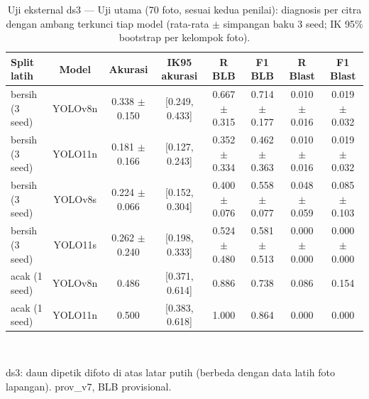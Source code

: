 \begin{table}[!t]
\centering
\caption{Uji eksternal ds3 — Uji utama (70 foto, sesuai kedua penilai): diagnosis per citra dengan ambang terkunci tiap model (rata-rata $\pm$ simpangan baku 3 seed; IK 95\% bootstrap per kelompok foto).}
\label{tab:ds3_utama}
\footnotesize
\begin{tabular}{lccccccc}
\hline
\textbf{Split latih} & \textbf{Model} & \textbf{Akurasi} & \textbf{IK95 akurasi} & \textbf{R BLB} & \textbf{F1 BLB} & \textbf{R Blast} & \textbf{F1 Blast} \\
\hline
bersih (3 seed) & YOLOv8n & 0.338 $\pm$ 0.150 & [0.249, 0.433] & 0.667 $\pm$ 0.315 & 0.714 $\pm$ 0.177 & 0.010 $\pm$ 0.016 & 0.019 $\pm$ 0.032 \\
bersih (3 seed) & YOLO11n & 0.181 $\pm$ 0.166 & [0.127, 0.243] & 0.352 $\pm$ 0.334 & 0.462 $\pm$ 0.363 & 0.010 $\pm$ 0.016 & 0.019 $\pm$ 0.032 \\
bersih (3 seed) & YOLOv8s & 0.224 $\pm$ 0.066 & [0.152, 0.304] & 0.400 $\pm$ 0.076 & 0.558 $\pm$ 0.077 & 0.048 $\pm$ 0.059 & 0.085 $\pm$ 0.103 \\
bersih (3 seed) & YOLO11s & 0.262 $\pm$ 0.240 & [0.198, 0.333] & 0.524 $\pm$ 0.480 & 0.581 $\pm$ 0.513 & 0.000 $\pm$ 0.000 & 0.000 $\pm$ 0.000 \\
acak (1 seed) & YOLOv8n & 0.486 & [0.371, 0.614] & 0.886 & 0.738 & 0.086 & 0.154 \\
acak (1 seed) & YOLO11n & 0.500 & [0.383, 0.618] & 1.000 & 0.864 & 0.000 & 0.000 \\
\hline
\end{tabular}
\\[2pt]\parbox{\columnwidth}{\scriptsize ds3: daun dipetik difoto di atas latar putih (berbeda dengan data latih foto lapangan). prov\_v7, BLB provisional.}
\end{table}
